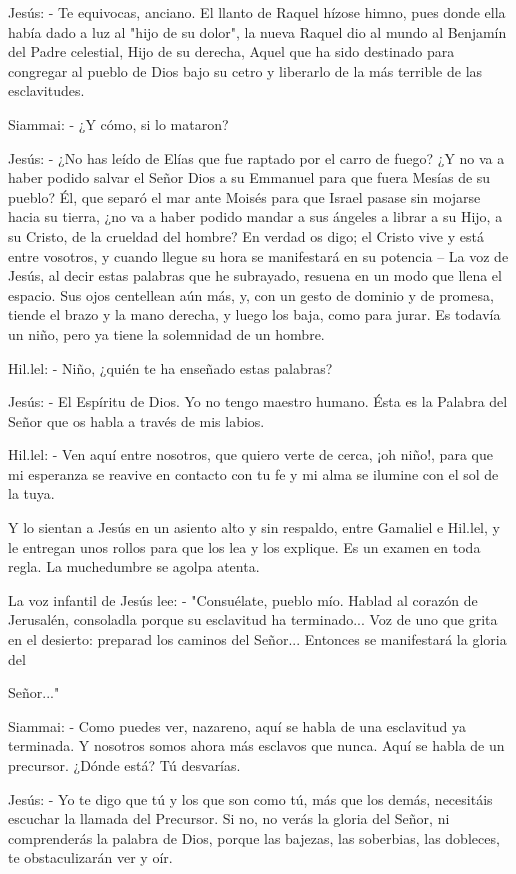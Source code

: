 \documentclass[12pt, twoside, openright]{book} %
\begin{document}
Jesús: - Te equivocas, anciano. El llanto de Raquel hízose himno, pues donde ella había dado a luz al "hijo de su dolor", la nueva Raquel dio al mundo al Benjamín del Padre celestial, Hijo de su derecha, Aquel que ha sido destinado para congregar al pueblo de Dios bajo su cetro y liberarlo de la más terrible de las esclavitudes. 

Siammai: - ¿Y cómo, si lo mataron? 

Jesús: - ¿No has leído de Elías que fue raptado por el carro de fuego? ¿Y no va a haber podido salvar el Señor Dios a su Emmanuel para que fuera Mesías de su pueblo? Él, que separó el mar ante Moisés para que Israel pasase sin mojarse hacia su tierra, ¿no va a haber podido mandar a sus ángeles a librar a su Hijo, a su Cristo, de la crueldad del hombre? En verdad os digo; el Cristo vive y está entre vosotros, y cuando llegue su hora se manifestará en su potencia – La voz de Jesús, al decir estas palabras que he subrayado, resuena en un modo que llena el espacio. Sus ojos centellean aún más, y, con un gesto de dominio y de promesa, tiende el brazo y la mano derecha, y luego los baja, como para jurar. Es todavía un niño, pero ya tiene la solemnidad de un hombre. 

Hil.lel: - Niño, ¿quién te ha enseñado estas palabras? 

Jesús: - El Espíritu de Dios. Yo no tengo maestro humano. Ésta es la Palabra del Señor que os habla a través de mis labios. 

Hil.lel: - Ven aquí entre nosotros, que quiero verte de cerca, ¡oh niño!, para que mi esperanza se reavive en contacto con tu fe y mi alma se ilumine con el sol de la tuya. 

Y lo sientan a Jesús en un asiento alto y sin respaldo, entre Gamaliel e Hil.lel, y le entregan unos rollos para que los lea y los explique. Es un examen en toda regla. La muchedumbre se agolpa atenta. 

La voz infantil de Jesús lee: - "Consuélate, pueblo mío. Hablad al corazón de Jerusalén, consoladla porque su esclavitud ha terminado... Voz de uno que grita en el desierto: preparad los caminos del Señor... Entonces se manifestará la gloria del 

Señor..." 

Siammai: - Como puedes ver, nazareno, aquí se habla de una esclavitud ya terminada. Y nosotros somos ahora más esclavos que nunca. Aquí se habla de un precursor. ¿Dónde está? Tú desvarías. 

Jesús: - Yo te digo que tú y los que son como tú, más que los demás, necesitáis escuchar la llamada del Precursor. Si no, no verás la gloria del Señor, ni comprenderás la palabra de Dios, porque las bajezas, las soberbias, las dobleces, te obstaculizarán ver y oír. 
\end{document}
